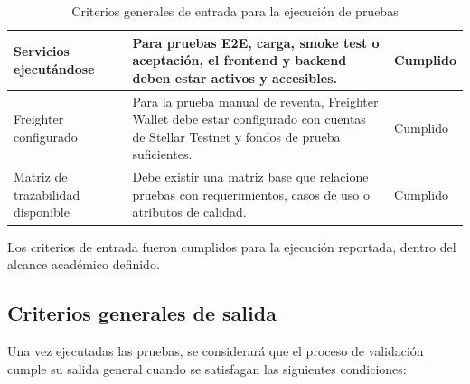 \documentclass[12pt,letterpaper]{article}
\begin{document}
\begin{table}[H]
\begin{tabularx}{\textwidth}{|
>{\raggedright\arraybackslash}p{3.5cm}|
>{\raggedright\arraybackslash}X|
>{\centering\arraybackslash}p{2.2cm}|}
Servicios ejecutándose &
Para pruebas E2E, carga, smoke test o aceptación, el frontend y backend deben estar activos y accesibles. &
Cumplido \\
\hline

Freighter configurado &
Para la prueba manual de reventa, Freighter Wallet debe estar configurado con cuentas de Stellar Testnet y fondos de prueba suficientes. &
Cumplido \\
\hline

Matriz de trazabilidad disponible &
Debe existir una matriz base que relacione pruebas con requerimientos, casos de uso o atributos de calidad. &
Cumplido \\
\hline

\end{tabularx}

\endgroup
\caption{Criterios generales de entrada para la ejecución de pruebas}
\label{tab:criterios-generales-entrada}
\end{table}

Los criterios de entrada fueron cumplidos para la ejecución reportada, dentro del alcance académico definido.

\subsection{Criterios generales de salida}

Una vez ejecutadas las pruebas, se considerará que el proceso de validación cumple su salida general cuando se satisfagan las siguientes condiciones:
\end{document}
